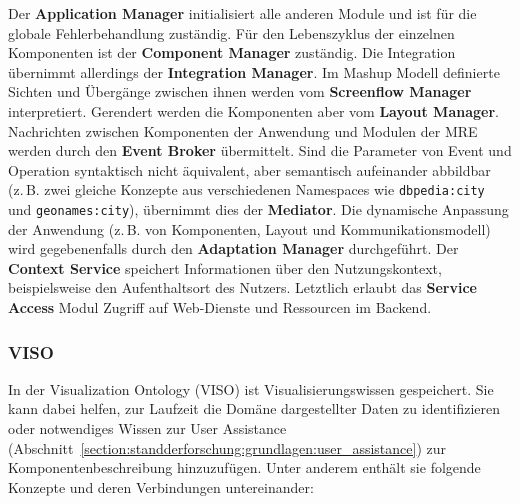 \documentclass[
	headsepline,
	footsepline,
	fontsize=12pt,
	bibliography=totoc
]{scrbook}
\begin{document}
Der \textbf{Application Manager} initialisiert alle anderen Module und ist für die globale Fehlerbehandlung zuständig. Für den Lebenszyklus der einzelnen Komponenten ist der \textbf{Component Manager} zuständig. Die Integration übernimmt allerdings der \textbf{Integration Manager}. Im Mashup Modell definierte Sichten und Übergänge zwischen ihnen werden vom \textbf{Screenflow Manager} interpretiert. Gerendert werden die Komponenten aber vom \textbf{Layout Manager}. Nachrichten zwischen Komponenten der Anwendung und Modulen der MRE werden durch den \textbf{Event Broker} übermittelt. Sind die Parameter von Event und Operation syntaktisch nicht äquivalent, aber semantisch aufeinander abbildbar (z.\,B. zwei gleiche Konzepte aus verschiedenen Namespaces wie \texttt{dbpedia:city} und \texttt{geonames:city}), übernimmt dies der \textbf{Mediator}. Die dynamische Anpassung der Anwendung (z.\,B. von Komponenten, Layout und Kommunikationsmodell) wird gegebenenfalls durch den \textbf{Adaptation Manager} durchgeführt. Der \textbf{Context Service} \cite{Pietschmann2008} speichert Informationen über den Nutzungskontext, beispielsweise den Aufenthaltsort des Nutzers. Letztlich erlaubt das \textbf{Service Access} Modul Zugriff auf Web-Dienste und Ressourcen im Backend.

\subsubsection{VISO}
\label{section:standderforschung:grundlagen:cruise_vizboard:viso}

In der Visualization Ontology (VISO) ist Visualisierungswissen gespeichert. Sie kann dabei helfen, zur Laufzeit die Domäne dargestellter Daten zu identifizieren oder notwendiges Wissen zur User Assistance (Abschnitt~\ref{section:standderforschung:grundlagen:user_assistance}) zur Komponentenbeschreibung hinzuzufügen. Unter anderem enthält sie folgende Konzepte und deren Verbindungen untereinander:
\end{document}
